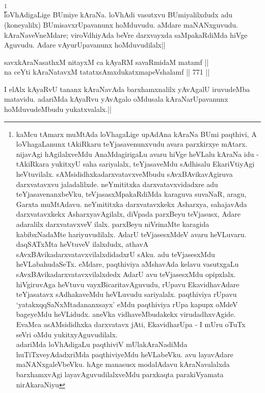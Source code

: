 \begin{artha} 
\footnote[2]{kaMcu tAmarx muMtAda loVhagaLige upAdAna kAraNa BUmi 
paqthivi, A loVhagaLanunx tAkiRkaru teYjasavenunxvudu avara parxkirxye 
mAtarx. nijavAgi hAgilalxveMdu AnaMdagirigaLu avaru hiVge heVLalu 
kAraNa idu - tAkiRkara yukitxyU saha sariyalalx, teYjasaveMdu 
sAdhisalu EkariVtiyAgi heVtuvilalx. sAMsididhxkadarxvatavxveMbudu 
sAvxBAvikavAgiruva darxvatavxvu jaladalilxde. neYmititxka 
darxvatavxvidadxre adu teYjasavenanxbeVku, teVjasasxMpakaRdiMda 
karaguva suvaNaR, aragu, Garxta muMtAdavu. neYmititxka darxvatavxkekx 
Asharxya, sahajavAda darxvatavxkekx AsharxyavAgilalx, diVpada parxBeyu 
teVjasusx, Adare adaralilx darxvatavxveV ilalx. parxBeyu niVrinaMte 
karagida kabibxNadaMte hariyuvudilalx. AdarU teVjasesxMdeV avaru 
heVLuvaru. daqSATxMta heVtuveV ilalxdudx, athavA 
sAvxBAvikadarxvatavxvilalxdidadxrU sAku. adu teVjasesxMdu 
heVLabahudaSeTx. eMdare, paqthiviya aMshavAda kelavu vasutxgaLu 
sAvxBAvikadarxvatavxvilalxdedx AdarU avu teVjasesxMdu opipxlalx. 
hiVgiruvAga heVtuvu vayxBicaritavAguvudu, rUpavu EkavidhavAdare 
teYjasatavx sAdhakaveMdu heVLuvudu sariyalalx. paqthiviya rUpavu 
`yatakxqqSaNxMtadananxsayx' eMdu paqthiviya rUpa kapupx oMdeV 
bageyeMdu heVLidudx. aneVka vidhaveMbudakekx virudadhxvAgide. EvaMca 
asAMsididhxka darxvatavx jAti, EkavidharUpa - I mUru oTuTx seVri oMdu 
yukitxyAguvudilalx.\\ 
adariMda loVhAdigaLu paqthiviV mUlakAraNadiMda huTiTxveyAdadxriMda 
paqthiviyeMdu heVLabeVku. avu layavAdare maNANxgaleVbeVku. hAge 
manasusx modalAdavu kAraNavalalxda barxhamxvAgi layavAguvudilalxveMdu 
parxkaqta parakiVyamata nirAkaraNiyu}\\
loVhAdigaLige BUmiye kAraNa. loVhAdi vasutxvu BUmiyalilxdudx adu 
(koneyalilx) BUmisavxrUpavanunx hoMduvudu. aMdare maNANxguvudu. 
kAraNaveVneMdare; viroVdhiyAda beVre darxvayxda saMpakaRdiMda hiVge 
Aguvudu. Adare vAyurUpavanunx hoMduvudilalx||
\end{artha}


\begin{shl}
savxkAraNasathxM nitayxM ca kAyaRM savaRmidaM matamf || \\
na ceYti kAraNatavxM tatatxsAmxdukatxmapeVshalamf ||  771 ||  
\end{shl}

\begin{artha} 
I elAlx kAyaRvU tananx kAraNavAda barxhamxnalilx yAvAgalU iruvudeMba 
matavidu. adariMda kAyaRvu yAvAgalo oMdusala kAraNarUpavanunx 
hoMduvudeMbudu yukatxvalalx.||
\end{artha}

